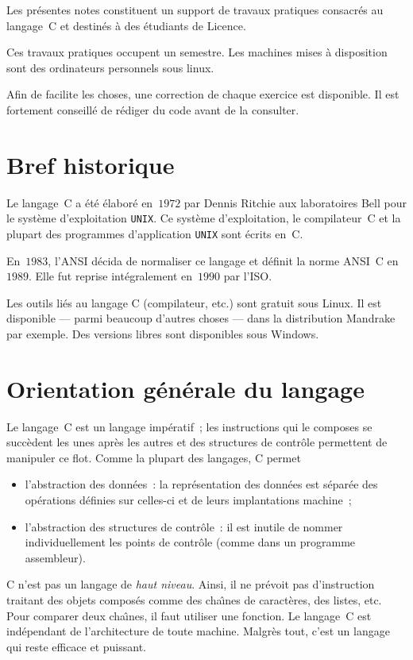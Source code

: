 Les  pr\'esentes  notes  constituent un support   de travaux pratiques
consacr\'es au langage~C et destin\'es  \`a des \'etudiants de Licence.
\par
Ces travaux pratiques occupent  un  semestre.  Les machines mises  \`a
disposition sont des  ordinateurs    personnels   sous  linux.     
\ifcorrection
\par
Afin  de facilite les  choses, une correction   de chaque exercice est
disponible. Il est fortement conseill\'e de r\'ediger du code avant de la
consulter.
\fi
\section*{Bref historique}
\label{sec:BrefHistorique}
Le langage~C a \'et\'e  \'elabor\'e  en~$1972$ par Dennis  Ritchie aux
laboratoires Bell pour  le syst\`eme d'exploitation \texttt{UNIX}.  Ce
syst\`eme d'exploitation,   le   compilateur~C  et  la    plupart  des
programmes d'application \texttt{UNIX} sont \'ecrits en~C.
\par
En~$1983$,  l'ANSI d\'ecida de normaliser ce   langage et d\'efinit la
norme ANSI~C  en~$1989$.   Elle fut reprise  int\'egralement en~$1990$
par l'ISO.
\par
Les outils li\'es au langage C (compilateur, etc.) sont gratuit sous
Linux.  Il est disponible --- parmi beaucoup d'autres choses --- dans
la distribution Mandrake par exemple.  Des versions libres sont
disponibles sous Windows.
\section*{Orientation g\'en\'erale du langage}
\label{Orientation}
Le langage~C  est un  langage  imp\'eratif~;  les instructions  qui le
composes se succ\`edent les unes apr\`es les  autres et des structures
de  contr\^ole permettent de  manipuler   ce flot.  Comme la plupart
des langages, C permet
\begin{itemize}
\item l'abstraction des  donn\'ees~: la repr\'esentation des donn\'ees
  est   s\'epar\'ee des op\'erations d\'efinies    sur celles-ci et de
  leurs implantations machine~;
\item l'abstraction des structures de  contr\^ole~: il est inutile  de
  nommer   individuellement les points  de  contr\^ole  (comme dans un
  programme assembleur).
\end{itemize}
C n'est pas un langage de \textit{haut niveau}. Ainsi, il ne pr\'evoit
pas d'instruction traitant des objets compos\'es comme des cha\^\i{}nes
de caract\`eres, des listes, etc.  Pour comparer deux cha\^\i{}nes, il
faut  utiliser une  fonction.   Le   langage~C  est ind\'ependant   de
l'architecture de toute machine. Malgr\`es tout,  c'est un langage qui
reste efficace et puissant.
